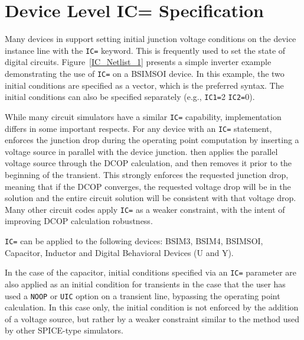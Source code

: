 \newpage
\section{Device Level IC= Specification}
\label{IC_equals_spec}


Many devices in \Xyce{} support setting initial junction voltage
conditions on the device instance line with the \texttt{IC=} keyword.
This is frequently used to set the state of digital circuits.
Figure~\ref{IC_Netlist_1} presents a simple inverter example
demonstrating the use of \texttt{IC=} on a BSIMSOI device.  In this
example, the two initial conditions are specified as a vector, which is the
preferred syntax.  The initial conditions can also be specified separately
(e.g., \texttt{IC1=}2  \texttt{IC2=}0).

While many circuit simulators have a similar \texttt{IC=} capability,
\Xyce{} implementation differs in some important respects.  For any
device with an \texttt{IC=} statement, \Xyce{} enforces the junction
drop during the operating point computation by inserting a voltage
source in parallel with the device junction.  \Xyce{} then applies the
parallel voltage source through the DCOP calculation, and then removes
it prior to the beginning of the transient.  This strongly enforces
the requested junction drop, meaning that if the DCOP converges, the
requested voltage drop will be in the solution and the entire circuit
solution will be consistent with that voltage drop.  Many other
circuit codes apply \texttt{IC=} as a weaker constraint, with the
intent of improving DCOP calculation robustness.

\texttt{IC=} can be applied to the following devices:  BSIM3, BSIM4, BSIMSOI,
Capacitor, Inductor and Digital Behavioral Devices (U and Y).

In the case of the capacitor, initial conditions specified via an
\texttt{IC=} parameter are also applied as an initial condition for
transients in the case that the user has used a \texttt{NOOP} or
\texttt{UIC} option on a transient line, bypassing the operating point
calculation.  In this case only, the initial condition is not enforced by
the addition of a voltage source, but rather by a weaker constraint
similar to the method used by other SPICE-type simulators.

